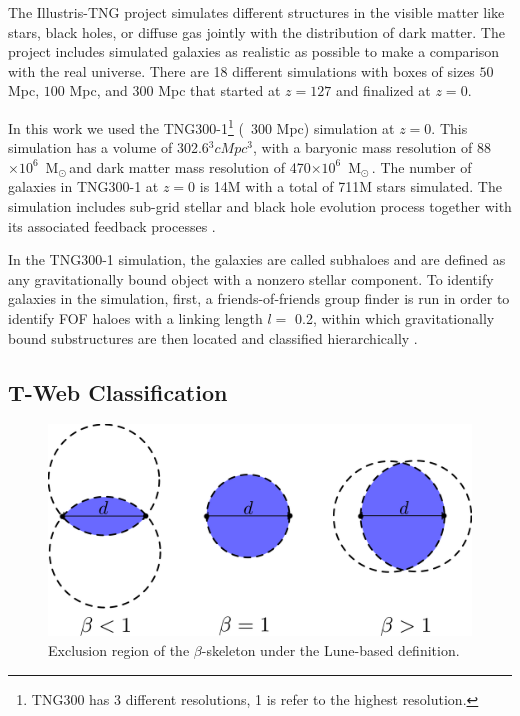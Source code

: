 \documentclass[usenatbib]{mnras}
\newcommand{\Msun}{\,{\rm M}$_{\odot}$\,}
\begin{document}
The Illustris-TNG project simulates different structures in the visible matter like stars, black holes, or diffuse gas jointly with the distribution of dark matter.
The project includes simulated galaxies as realistic as possible to
make a comparison with the real universe. There are 18 different
simulations with boxes of sizes $50$ Mpc, $100$ Mpc, and $300$ Mpc that started at $z=127$ and finalized at $z=0$.    

In this work we used the TNG300-1\footnote{TNG300 has 3 different resolutions, 1 is refer to the highest resolution.}  (~300 Mpc) simulation at $z=0$.
This simulation has a volume of 302.6$^3 cMpc^3$, with a baryonic mass resolution of 88$\times 10^{6}$ \Msun  and dark matter mass resolution of 470$\times  10^{6}$ \Msun \citep{Nelson2019}.
The number of galaxies in TNG300-1 at $z=0$ is 14M 
with a total of 711M stars simulated. 
The simulation includes sub-grid stellar and black hole evolution process together with its associated 
feedback processes \citep{Nelson2019,Pillepich2018a,Springel2018}.

In the TNG300-1 simulation, the galaxies are called subhaloes and are defined as any gravitationally
bound object with a nonzero
stellar component.
To identify galaxies in the simulation,
first, a friends-of-friends group finder is run
in order to identify FOF haloes with
a linking length $l=$ 0.2,
within which gravitationally bound substructures
are then located and classified hierarchically \citep{Pillepich2018a}.
 
\subsection{T-Web Classification}

\begin{figure}
\centering
 \includegraphics[scale=0.18]{Figs/p_beta.pdf}
 \caption{Exclusion region of the $\beta$-skeleton under the Lune-based definition.}  
 \label{fig:beta}
\end{figure}
\end{document}
